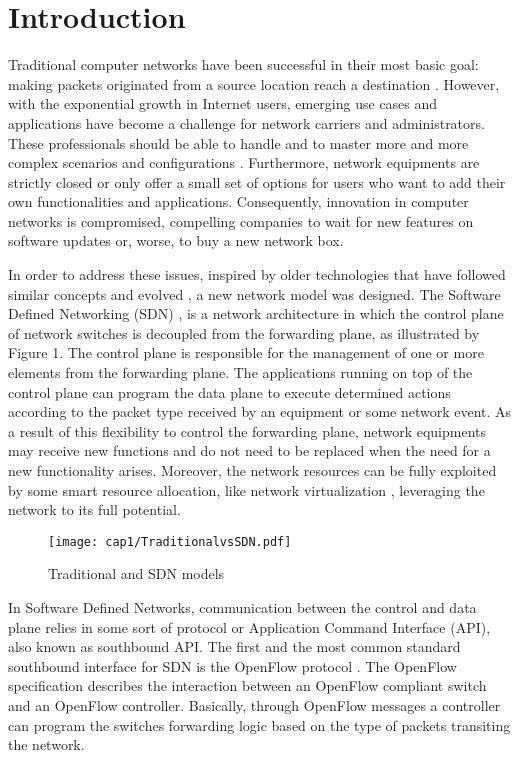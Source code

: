 \chapter{Introduction}
\label{cap:intro}

Traditional computer networks have been successful in their most basic goal: making packets originated from a source location reach a destination \cite{Shenker95fundamentaldesign}. However, with the exponential growth in Internet users, emerging use cases and applications have become a challenge for network carriers and administrators. These professionals should be able to handle and to master more and more complex scenarios and configurations \cite{Feldmann:2007:ICD:1273445.1273453}. Furthermore, network equipments are strictly closed or only offer a small set of options for users who want to add their own functionalities and applications. Consequently, innovation in computer networks is compromised, compelling companies to wait for new features on software updates or, worse, to buy a new network box. 

In order to address these issues, inspired by older technologies that have followed similar concepts and evolved \cite{Feamster:2014:RSI:2602204.2602219}, a new network model was designed. The Software Defined Networking (SDN) \cite{DBLP:journals/corr/KreutzRVRAU14}, is a network architecture in which the control plane of network switches is decoupled from the forwarding plane, as illustrated by Figure 1. The control plane is responsible for the management of one or more elements from the forwarding plane. The applications running on top of the control plane can program the data plane to execute determined actions according to the packet type received by an equipment or some network event. As a result of this flexibility to control the forwarding plane, network equipments may receive new functions and do not need to be replaced when the need for a new functionality arises. Moreover, the network resources can be fully exploited by some smart resource allocation, like network virtualization \cite{FLOWVISOR} \cite{Al-Shabibi:2014:OMY:2620728.2620741}, leveraging the network to its full potential.

\begin{figure}[h!]
\centering
\texttt{[image: cap1/TraditionalvsSDN.pdf]}
\caption{Traditional and SDN models}
\label{fig:traditional_vs_sdn}
\end{figure}
    
In Software Defined Networks, communication between the control and data plane relies in some sort of protocol or Application Command Interface (API), also known as southbound API. The first and the most common standard southbound interface for SDN is the OpenFlow protocol \cite{McKeown:2008:OEI:1355734.1355746} \cite{2012onf_sdn}. The OpenFlow specification describes the interaction between an OpenFlow compliant switch and an OpenFlow controller. Basically, through OpenFlow messages a controller can program the switches forwarding logic based on the type of packets transiting the network.     

